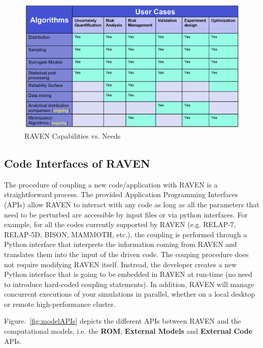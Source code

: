 \begin{figure}[h!]
  \includegraphics[width=\textwidth]{pics/raven_cap.png}
  \caption{RAVEN Capabilities vs. Needs}
  \label{fig:ravenCap}
\end{figure}

\subsection{Code Interfaces of RAVEN}
The procedure of coupling a new code/application with RAVEN is a straightforward process. The provided Application
Programming Interfaces (APIs) allow RAVEN to interact with any code as long as all the parameters that need to be
perturbed are accessible by input files or via python interfaces. For example, for all the codes currently
supported by RAVEN (e.g. RELAP-7, RELAP-5D, BISON, MAMMOTH, etc.), the coupling is performed through a Python interface
that interprets the information coming from RAVEN and translates them into the input of the driven code. The couping procedure
does not require modifying RAVEN itself. Instread, the developer creates a new Python interface that is going to
be embedded in RAVEN at run-time (no need to introduce hard-coded coupling statements). In addition, RAVEN will
manage concurrent executions of your simulations in parallel, whether on a local desktop or remote high-performance cluster.

Figure.~\ref{fig:modelAPIs} depicts the different APIs between RAVEN and the computational models, i.e. the
\textbf{ROM}, \textbf{External Models} and \textbf{External Code} APIs. 

